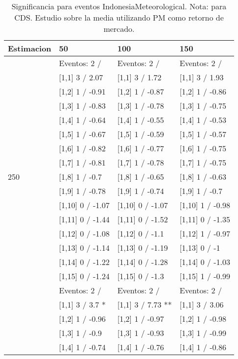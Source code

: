 \begin{table}

\caption{Significancia para eventos IndonesiaMeteorological. Nota: para CDS. Estudio sobre la media utilizando PM como retorno de mercado.}
\centering
\begin{tabular}[t]{llll}
\toprule
Estimacion & 50 & 100 & 150\\
\midrule
 & Eventos:  2 / & Eventos:  2 / & Eventos:  2 /\\
 & {}[1,1] 3  / 2.07 & {}[1,1] 3  / 1.72 & {}[1,1] 3  / 1.93\\
 & {}[1,2] 1  / -0.91 & {}[1,2] 1  / -0.87 & {}[1,2] 1  / -0.86\\
 & {}[1,3] 1  / -0.83 & {}[1,3] 1  / -0.78 & {}[1,3] 1  / -0.75\\
 & {}[1,4] 1  / -0.64 & {}[1,4] 1  / -0.55 & {}[1,4] 1  / -0.53\\
\addlinespace
 & {}[1,5] 1  / -0.67 & {}[1,5] 1  / -0.59 & {}[1,5] 1  / -0.57\\
 & {}[1,6] 1  / -0.82 & {}[1,6] 1  / -0.77 & {}[1,6] 1  / -0.75\\
 & {}[1,7] 1  / -0.81 & {}[1,7] 1  / -0.78 & {}[1,7] 1  / -0.75\\
250 & {}[1,8] 1  / -0.7 & {}[1,8] 1  / -0.65 & {}[1,8] 1  / -0.63\\
 & {}[1,9] 1  / -0.78 & {}[1,9] 1  / -0.74 & {}[1,9] 1  / -0.7\\
\addlinespace
 & {}[1,10] 0  / -1.07 & {}[1,10] 0  / -1.07 & {}[1,10] 1  / -0.98\\
 & {}[1,11] 0  / -1.44 & {}[1,11] 0  / -1.52 & {}[1,11] 0  / -1.35\\
 & {}[1,12] 0  / -1.08 & {}[1,12] 0  / -1.1 & {}[1,12] 1  / -0.97\\
 & {}[1,13] 0  / -1.14 & {}[1,13] 0  / -1.19 & {}[1,13] 0  / -1\\
 & {}[1,14] 0  / -1.22 & {}[1,14] 0  / -1.28 & {}[1,14] 0  / -1.03\\
\addlinespace
 & {}[1,15] 0  / -1.24 & {}[1,15] 0  / -1.3 & {}[1,15] 1  / -0.99\\
 & Eventos:  2 / & Eventos:  2 / & Eventos:  2 /\\
 & {}[1,1] 3  / 3.7 * & {}[1,1] 3  / 7.73 ** & {}[1,1] 3  / 3.06\\
 & {}[1,2] 1  / -0.96 & {}[1,2] 1  / -0.97 & {}[1,2] 1  / -0.98\\
 & {}[1,3] 1  / -0.9 & {}[1,3] 1  / -0.93 & {}[1,3] 1  / -0.99\\
\addlinespace
 & {}[1,4] 1  / -0.74 & {}[1,4] 1  / -0.76 & {}[1,4] 1  / -0.86\\

\end{tabular}
\end{table}
